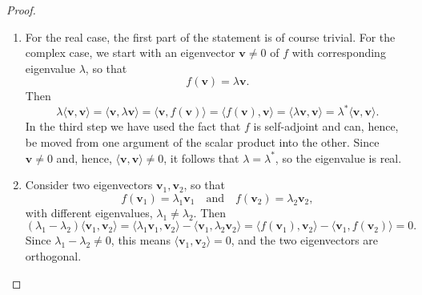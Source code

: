 \documentclass[a4paper,12pt]{report}
\begin{document}
\begin{proof}
\begin{enumerate}[label=(P\arabic*)]
    \item For the real case, the first part of the statement is of course trivial. For the complex case, we start with an eigenvector \( \mathbf{v} \neq 0 \) of \( f \) with corresponding eigenvalue \( \lambda \), so that 
    \begin{equation}
        f(\mathbf{v}) = \lambda \mathbf{v}.
    \end{equation}
    Then
    \begin{equation}
        \lambda \langle \mathbf{v}, \mathbf{v} \rangle 
        = \langle \mathbf{v}, \lambda \mathbf{v} \rangle 
        = \langle \mathbf{v}, f(\mathbf{v}) \rangle 
        = \langle f(\mathbf{v}), \mathbf{v} \rangle 
        = \langle \lambda \mathbf{v}, \mathbf{v} \rangle 
        = \lambda^* \langle \mathbf{v}, \mathbf{v} \rangle.
    \end{equation}
    In the third step we have used the fact that \( f \) is self-adjoint and can, hence, be moved from one argument of the scalar product into the other. Since \( \mathbf{v} \neq 0 \) and, hence, \( \langle \mathbf{v}, \mathbf{v} \rangle \neq 0 \), it follows that \( \lambda = \lambda^* \), so the eigenvalue is real.
    
    \item Consider two eigenvectors \( \mathbf{v}_1, \mathbf{v}_2 \), so that 
    \begin{equation}
        f(\mathbf{v}_1) = \lambda_1 \mathbf{v}_1 
        \quad \text{and} \quad 
        f(\mathbf{v}_2) = \lambda_2 \mathbf{v}_2,
    \end{equation}
    with different eigenvalues, \( \lambda_1 \neq \lambda_2 \). Then
    \begin{equation}
        (\lambda_1 - \lambda_2) \langle \mathbf{v}_1, \mathbf{v}_2 \rangle 
        = \langle \lambda_1 \mathbf{v}_1, \mathbf{v}_2 \rangle 
        - \langle \mathbf{v}_1, \lambda_2 \mathbf{v}_2 \rangle 
        = \langle f(\mathbf{v}_1), \mathbf{v}_2 \rangle 
        - \langle \mathbf{v}_1, f(\mathbf{v}_2) \rangle 
        = 0.
    \end{equation}
    Since \( \lambda_1 - \lambda_2 \neq 0 \), this means \( \langle \mathbf{v}_1, \mathbf{v}_2 \rangle = 0 \), and the two eigenvectors are orthogonal.
\end{enumerate}

\end{proof}
\end{document}
